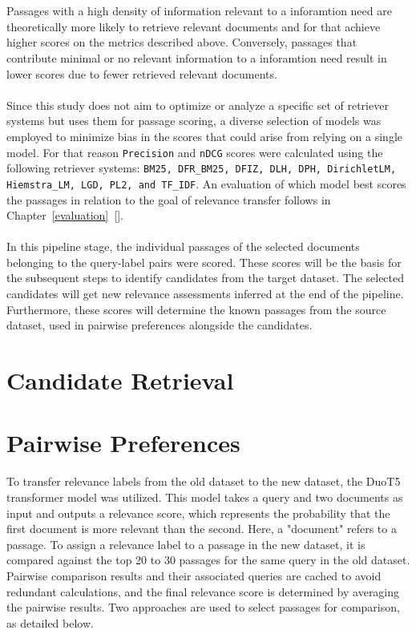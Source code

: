\\\\
Passages with a high density of information relevant to a inforamtion need are theoretically more likely to retrieve relevant documents and  for that achieve higher scores on the metrics described above. Conversely, passages that contribute minimal or no relevant information to a inforamtion need result in lower scores due to fewer retrieved relevant documents.
\\\\
Since this study does not aim to optimize or analyze a specific set of retriever systems but uses them for passage scoring, a diverse selection of models was employed to minimize bias in the scores that could arise from relying on a single model. For that reason \texttt{Precision} and \texttt{nDCG} scores were calculated using the following retriever systems: \texttt{BM25, DFR\_BM25, DFIZ, DLH, DPH, DirichletLM, Hiemstra\_LM, LGD, PL2, and TF\_IDF}. An evaluation of which model best scores the passages in relation to the goal of relevance transfer follows in Chapter~\ref{evaluation}~[].
\\\\
In this pipeline stage, the individual passages of the selected documents belonging to the query-label pairs were scored. These scores will be the basis for the subsequent steps to identify candidates from the target dataset. The selected candidates will get new relevance assessments inferred at the end of the pipeline. Furthermore, these scores will determine the known passages from the source dataset, used in pairwise preferences alongside the candidates.


\section{Candidate Retrieval}\label{candidate-retrieval}


\section{Pairwise Preferences}\label{pairwise-transfering-relevance-labels-across-datasets}

To transfer relevance labels from the old dataset to the new dataset, the DuoT5 transformer model was utilized. This model takes a query and two documents as input and outputs a relevance score, which represents the probability that the first document is more relevant than the second. Here, a "document" refers to a passage. To assign a relevance label to a passage in the new dataset, it is compared against the top 20 to 30 passages for the same query in the old dataset. Pairwise comparison results and their associated queries are cached to avoid redundant calculations, and the final relevance score is determined by averaging the pairwise results. Two approaches are used to select passages for comparison, as detailed below.

